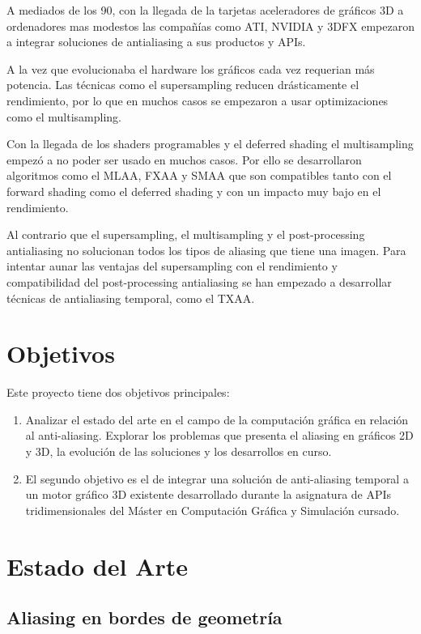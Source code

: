 \documentclass[withindex, glossary]{cam-thesis}
\begin{document}
A mediados de los 90, con la llegada de la tarjetas aceleradores de gráficos 3D a ordenadores mas modestos las compañías como ATI, NVIDIA y 3DFX empezaron a integrar soluciones de antialiasing a sus productos y APIs.

A la vez que evolucionaba el hardware los gráficos cada vez requerian más potencia. Las técnicas como el supersampling reducen drásticamente el rendimiento, por lo que en muchos casos se empezaron a usar optimizaciones como el multisampling.

Con la llegada de los shaders programables y el deferred shading el multisampling empezó a no poder ser usado en muchos casos. Por ello se desarrollaron algoritmos como el MLAA, FXAA y SMAA que son compatibles tanto con el forward shading como el deferred shading y con un impacto muy bajo en el rendimiento.

Al contrario que el supersampling, el multisampling y el post-processing antialiasing no solucionan todos los tipos de aliasing que tiene una imagen. Para intentar aunar las ventajas del supersampling con el rendimiento y compatibilidad del post-processing antialiasing se han empezado a desarrollar técnicas de antialiasing temporal, como el TXAA.

\chapter{Objetivos}

Este proyecto tiene dos objetivos principales:

\begin{enumerate}
    \item Analizar el estado del arte en el campo de la computación gráfica en relación al anti-aliasing. Explorar los problemas que presenta el aliasing en gráficos 2D y 3D, la evolución de las soluciones y los desarrollos en curso.
    \item El segundo objetivo es el de integrar una solución de anti-aliasing temporal a un motor gráfico 3D existente desarrollado durante la asignatura de APIs tridimensionales del Máster en Computación Gráfica y Simulación cursado.
\end{enumerate}

\chapter{Estado del Arte}

\section{Aliasing en bordes de geometría}
\end{document}
